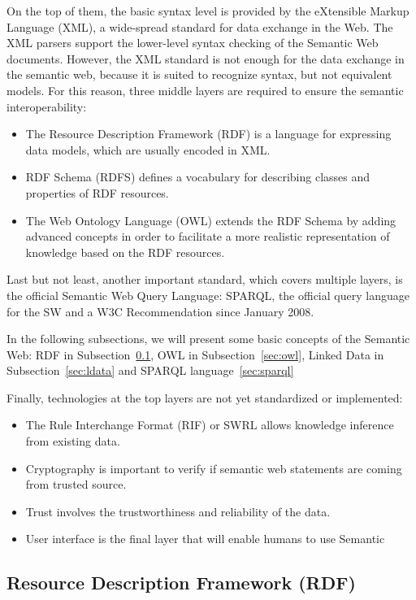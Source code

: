 On the top of them, the basic syntax level is provided by the eXtensible Markup Language (XML), a wide-spread standard for data exchange in the Web. The XML parsers support the lower-level syntax checking of the Semantic Web documents. However, the XML standard is not enough for the data exchange in the semantic web, because it is suited to recognize syntax, but not equivalent models. For this reason, three middle layers are required to ensure the semantic interoperability:
\begin{itemize}
\item The Resource Description Framework (RDF) is a language for expressing data models, which are usually encoded in XML.
\item RDF Schema (RDFS) defines a vocabulary for describing classes and properties of RDF resources.
\item The Web Ontology Language (OWL) extends the RDF Schema by adding advanced concepts in order to facilitate a more realistic representation of knowledge based on the RDF resources.
\end{itemize} 

Last but not least, another important standard, which covers multiple layers, is the official Semantic Web Query Language: SPARQL,  the official query language for the SW and a W3C Recommendation since January 2008. 

In the following subsections, we will present some basic concepts of the Semantic Web:  RDF in Subsection~\ref{sec:rdf},  OWL in Subsection~\ref{sec:owl}, Linked Data in Subsection~\ref{sec:ldata} and SPARQL language~\ref{sec:sparql}

Finally, technologies at the top layers are not yet standardized or implemented:
\begin{itemize}
\item The Rule Interchange Format (RIF) or SWRL allows knowledge inference from existing data.
\item Cryptography is important to verify if semantic web statements are coming from trusted source.
\item Trust involves the trustworthiness and reliability of the data.
\item User interface is the final layer that will enable humans to use Semantic
\end{itemize} 

\subsection{Resource Description Framework (RDF)}\label{sec:rdf}

